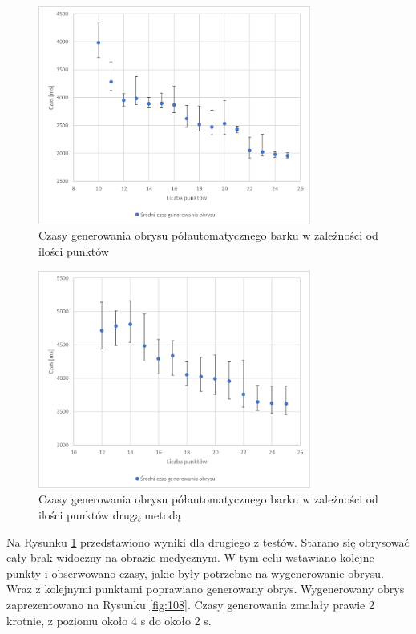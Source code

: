 \documentclass[a4paper,11pt,twoside,openright]{report}
\theoremstyle{definition}
\begin{document}
\begin{figure}[h!]
	\center
	\includegraphics[width=0.8\textwidth]{testy_2}
	\caption{Czasy generowania obrysu półautomatycznego barku w zależności od ilości punktów}
    	\label{fig:testy_2}
\end{figure}

\begin{figure}[htb!]
	\center
	\includegraphics[width=0.8\textwidth]{testy_3}
	\caption{Czasy generowania obrysu półautomatycznego barku w zależności od ilości punktów drugą metodą}
    	\label{fig:testy_3}
\end{figure}

Na Rysunku \ref{fig:testy_2} przedstawiono wyniki dla drugiego z testów. Starano
się obrysować cały brak widoczny na obrazie medycznym. W tym celu wstawiano kolejne
punkty i obserwowano czasy, jakie były potrzebne na wygenerowanie obrysu. Wraz z
kolejnymi punktami poprawiano generowany obrys. Wygenerowany obrys zaprezentowano
na Rysunku \ref{fig:108}. Czasy generowania zmalały prawie 2 krotnie, z poziomu
około 4 s do około 2 s.
\end{document}
